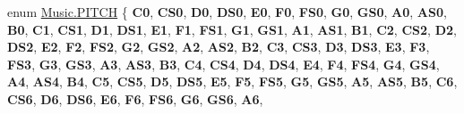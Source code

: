 \begin{DoxyCompactItemize}
enum \hyperlink{group___enums_ga508f69b199ea518f935486c990edac1d}{Music.\+P\+I\+T\+CH} \{ \newline
{\bfseries C0}, 
{\bfseries C\+S0}, 
{\bfseries D0}, 
{\bfseries D\+S0}, 
\newline
{\bfseries E0}, 
{\bfseries F0}, 
{\bfseries F\+S0}, 
{\bfseries G0}, 
\newline
{\bfseries G\+S0}, 
{\bfseries A0}, 
{\bfseries A\+S0}, 
{\bfseries B0}, 
\newline
{\bfseries C1}, 
{\bfseries C\+S1}, 
{\bfseries D1}, 
{\bfseries D\+S1}, 
\newline
{\bfseries E1}, 
{\bfseries F1}, 
{\bfseries F\+S1}, 
{\bfseries G1}, 
\newline
{\bfseries G\+S1}, 
{\bfseries A1}, 
{\bfseries A\+S1}, 
{\bfseries B1}, 
\newline
{\bfseries C2}, 
{\bfseries C\+S2}, 
{\bfseries D2}, 
{\bfseries D\+S2}, 
\newline
{\bfseries E2}, 
{\bfseries F2}, 
{\bfseries F\+S2}, 
{\bfseries G2}, 
\newline
{\bfseries G\+S2}, 
{\bfseries A2}, 
{\bfseries A\+S2}, 
{\bfseries B2}, 
\newline
{\bfseries C3}, 
{\bfseries C\+S3}, 
{\bfseries D3}, 
{\bfseries D\+S3}, 
\newline
{\bfseries E3}, 
{\bfseries F3}, 
{\bfseries F\+S3}, 
{\bfseries G3}, 
\newline
{\bfseries G\+S3}, 
{\bfseries A3}, 
{\bfseries A\+S3}, 
{\bfseries B3}, 
\newline
{\bfseries C4}, 
{\bfseries C\+S4}, 
{\bfseries D4}, 
{\bfseries D\+S4}, 
\newline
{\bfseries E4}, 
{\bfseries F4}, 
{\bfseries F\+S4}, 
{\bfseries G4}, 
\newline
{\bfseries G\+S4}, 
{\bfseries A4}, 
{\bfseries A\+S4}, 
{\bfseries B4}, 
\newline
{\bfseries C5}, 
{\bfseries C\+S5}, 
{\bfseries D5}, 
{\bfseries D\+S5}, 
\newline
{\bfseries E5}, 
{\bfseries F5}, 
{\bfseries F\+S5}, 
{\bfseries G5}, 
\newline
{\bfseries G\+S5}, 
{\bfseries A5}, 
{\bfseries A\+S5}, 
{\bfseries B5}, 
\newline
{\bfseries C6}, 
{\bfseries C\+S6}, 
{\bfseries D6}, 
{\bfseries D\+S6}, 
\newline
{\bfseries E6}, 
{\bfseries F6}, 
{\bfseries F\+S6}, 
{\bfseries G6}, 
\newline
{\bfseries G\+S6}, 
{\bfseries A6}, 

\end{DoxyCompactItemize}
